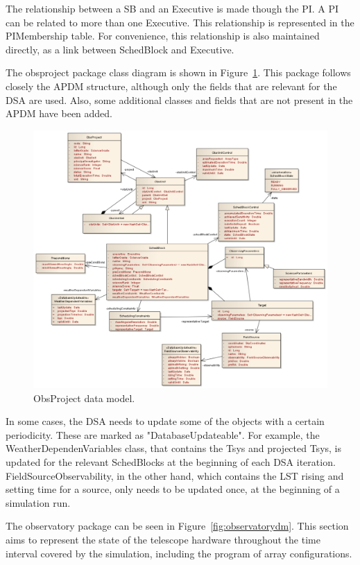 \documentclass{article}
\begin{document}
The relationship between a SB and an Executive is made though the PI. A PI can be related to more than one
Executive. This relationship is represented in the PIMembership table. For convenience, this relationship
is also maintained directly, as a link between SchedBlock and Executive.

The obsproject package class diagram is shown in Figure~\ref{fig:obsprojectdm}. This package follows closely the APDM
structure, although only the fields that are relevant for the DSA are used. Also, some additional classes
and fields that are not present in the APDM have been added.

\begin{figure}
\includegraphics[width=\textwidth]{ObsProject.pdf}
\caption{ObsProject data model.}
\label{fig:obsprojectdm}
\end{figure}

In some cases, the DSA needs to update some of the objects with a certain periodicity. These are marked
as "DatabaseUpdateable". For example, the WeatherDependenVariables class, that contains the Tsys
and projected Tsys, is updated for the relevant SchedBlocks at the beginning of each DSA iteration.
FieldSourceObservability, in the other hand, which contains the LST rising and setting time for a source,
only needs to be updated once, at the beginning of a simulation run.

The observatory package can be seen in Figure~\ref{fig:observatorydm}. This section aims to represent the state of the
telescope hardware throughout the time interval covered by the simulation, including the program of array
configurations.
\end{document}
